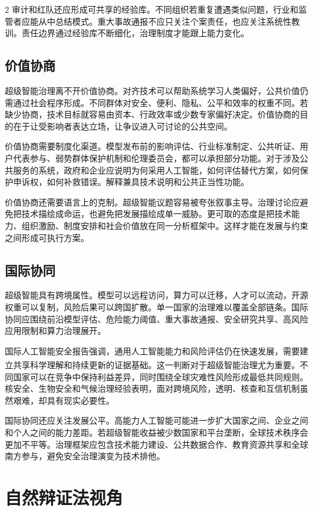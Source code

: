 \documentclass[a4paper,UTF8,zihao=5,twoside]{ctexart}
\newcommand{\upcite}[1]{\textsuperscript{\cite{#1}}}
\begin{document}
\begin{multicols}{2}
审计和红队还应形成可共享的经验库。不同组织若重复遭遇类似问题，行业和监管者应能从中总结模式。重大事故通报不应只关注个案责任，也应关注系统性教训。责任边界通过经验库不断细化，治理制度才能跟上能力变化。

\subsection{价值协商}

超级智能治理离不开价值协商。对齐技术可以帮助系统学习人类偏好，公共价值仍需通过社会程序形成。不同群体对安全、便利、隐私、公平和效率的权重不同。若缺少协商，技术目标就容易由资本、行政效率或少数专家偏好决定。价值协商的目的在于让受影响者表达立场，让争议进入可讨论的公共空间。

价值协商需要制度化渠道。模型发布前的影响评估、行业标准制定、公共听证、用户代表参与、弱势群体保护机制和伦理委员会，都可以承担部分功能。对于涉及公共服务的系统，政府和企业应说明为何采用人工智能，如何评估替代方案，如何保护申诉权，如何补救错误。解释兼具技术说明和公共正当性功能。

价值协商还需要语言上的克制。超级智能议题容易被夸张叙事主导。治理讨论应避免把技术描绘成命运，也避免把发展描绘成单一威胁。更可取的态度是把技术能力、组织激励、制度安排和社会价值放在同一分析框架中。这样才能在发展与约束之间形成可执行方案。

\subsection{国际协同}

超级智能具有跨境属性。模型可以远程访问，算力可以迁移，人才可以流动，开源权重可以复制，风险后果可以跨国扩散。单一国家的治理难以覆盖全部链条。国际协同应围绕前沿模型评估、危险能力阈值、重大事故通报、安全研究共享、高风险应用限制和算力治理展开。

国际人工智能安全报告强调，通用人工智能能力和风险评估仍在快速发展，需要建立共享科学理解和持续更新的证据基础\upcite{bengio2025}。这一判断对于超级智能治理尤为重要。不同国家可以在竞争中保持利益差异，同时围绕全球灾难性风险形成最低共同规则。核安全、生物安全和气候治理经验表明，面对跨境风险，透明、核查和互信机制虽然艰难，却具有现实必要性。

国际协同还应关注发展公平。高能力人工智能可能进一步扩大国家之间、企业之间和个人之间的能力差距。若超级智能收益被少数国家和平台垄断，全球技术秩序会更加不平等。治理框架应包含技术能力建设、公共数据合作、教育资源共享和全球南方参与，避免安全治理演变为技术排他。

\section{自然辩证法视角}


\end{multicols}
\end{document}
